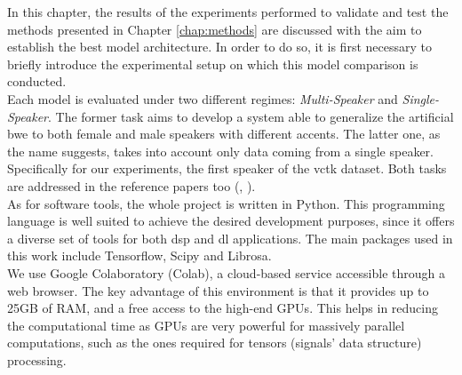 In this chapter, the results of the experiments performed to validate and test the methods presented in Chapter \ref{chap:methods} are discussed with the aim to establish the best model architecture. In order to do so, it is first necessary to briefly introduce the experimental setup on which this model comparison is conducted. \\
Each model is evaluated under two different regimes: \textit{Multi-Speaker} and \textit{Single-Speaker}. The former task aims to develop a system able to generalize the artificial \gls{bwe} to both female and male speakers with different accents. The latter one, as the name suggests, takes into account only data coming from a single speaker. Specifically for our experiments, the first speaker of the \gls{vctk} dataset. Both tasks are addressed in the reference papers too (\cite{lim2018time}, \cite{birnbaum2019temporal}). \\
As for software tools, the whole project is written in Python. This programming language is well suited to achieve the desired development purposes, since it offers a diverse set of tools for both \gls{dsp} and \gls{dl} applications. The main packages used in this work include Tensorflow, Scipy and Librosa. \\
We use Google Colaboratory (Colab), a cloud-based service accessible through a web browser. The key advantage of this environment is that it provides up to 25GB of RAM, and a free access to the high-end GPUs. This helps in reducing the computational time as GPUs are very powerful for massively parallel computations, such as the ones required for tensors (signals' data structure) processing.

